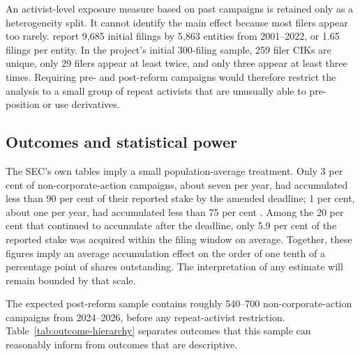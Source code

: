 An activist-level exposure measure based on past campaigns is retained only as
a heterogeneity split. It cannot identify the main effect because most filers
appear too rarely. \textcite{polk2024} report 9{,}685 initial filings by 5{,}863
entities from 2001--2022, or 1.65 filings per entity. In the project's initial
300-filing sample, 259 filer CIKs are unique, only 29 filers appear at least
twice, and only three appear at least three times. Requiring pre- and post-reform
campaigns would therefore restrict the analysis to a small group of repeat
activists that are unusually able to pre-position or use derivatives.

\subsection{Outcomes and statistical power}
\label{sec:outcomes}

The SEC's own tables imply a small population-average treatment. Only 3 per cent
of non-corporate-action campaigns, about seven per year, had accumulated less
than 90 per cent of their reported stake by the amended deadline; 1 per cent,
about one per year, had accumulated less than 75 per cent
\parencite{sec2023modernization}. Among the 20 per cent that continued to
accumulate after the deadline, only 5.9 per cent of the reported stake was
acquired within the filing window on average. Together, these figures imply an
average accumulation effect on the order of one tenth of a percentage point of
shares outstanding. The interpretation of any estimate will remain bounded by
that scale.

The expected post-reform sample contains roughly 540--700 non-corporate-action
campaigns from 2024--2026, before any repeat-activist restriction.
Table~\ref{tab:outcome-hierarchy} separates outcomes that this sample can
reasonably inform from outcomes that are descriptive.

